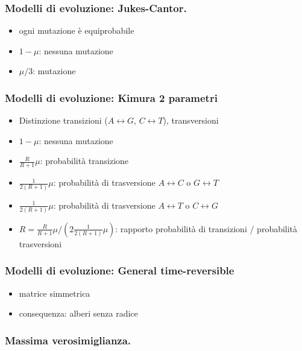 \begin{frame}[fragile]
  \frametitle{Modelli di evoluzione: Jukes-Cantor.}
\begin{itemize}
\item
  ogni mutazione è equiprobabile
\item
  $1-\mu$: nessuna mutazione
\item
  $\mu/3$: mutazione
\end{itemize}
\end{frame}

\begin{frame}[fragile]
  \frametitle{Modelli di evoluzione: Kimura 2 parametri}
\begin{itemize}
\item
  Distinzione transizioni ($A\leftrightarrow G$, $C\leftrightarrow T$), transversioni
\item
  $1-\mu$: nessuna mutazione
\item
  $\frac{R}{R+1}\mu$: probabilità transizione
\item
  $\frac{1}{2(R+1)}\mu$: probabilità di trasversione $A\leftrightarrow C$ o $G\leftrightarrow T$
\item
  $\frac{1}{2(R+1)}\mu$: probabilità di trasversione $A\leftrightarrow T$ o $C\leftrightarrow G$
\item
  $R = \frac{R}{R+1}\mu / \left(2 \frac{1}{2(R+1)}\mu \right)$: rapporto probabilità di transizioni / probabilità trasversioni
\end{itemize}
\end{frame}

\begin{frame}[fragile]
  \frametitle{Modelli di evoluzione: General time-reversible}
\begin{itemize}
\item
  matrice simmetrica
\item
  consequenza: alberi senza radice
\end{itemize}
\end{frame}


\begin{frame}[fragile]
\frametitle{Massima verosimiglianza.}
\end{frame}



